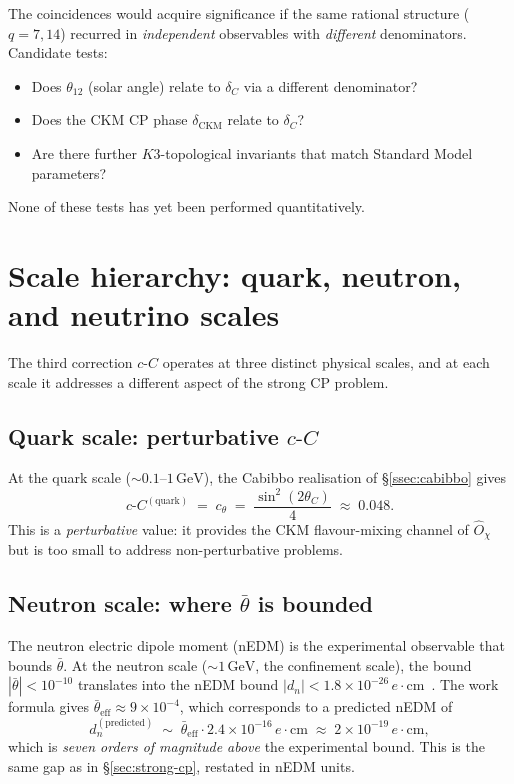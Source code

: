 \documentclass[11pt,a4paper]{article}
\newcommand{\dC}{\delta_C}
\newcommand{\cC}{c\text{-}C}
\newcommand{\Opchi}{\hat{O}_\chi}
\theoremstyle{plain}
\theoremstyle{definition}
\theoremstyle{remark}
\begin{document}
The coincidences would acquire significance if the same rational
structure ($q = 7, 14$) recurred in \emph{independent} observables
with \emph{different} denominators.  Candidate tests:
\begin{itemize}[leftmargin=1.4em,itemsep=1pt]
  \item Does $\theta_{12}$ (solar angle) relate to $\dC$ via a
        different denominator?
  \item Does the CKM CP phase $\delta_{\mathrm{CKM}}$ relate to
        $\dC$?
  \item Are there further $K3$-topological invariants that match
        Standard Model parameters?
\end{itemize}
None of these tests has yet been performed quantitatively.

\section{Scale hierarchy: quark, neutron, and neutrino scales}
\label{sec:scale}

The third correction $\cC$ operates at three distinct physical scales,
and at each scale it addresses a different aspect of the strong CP
problem.

\subsection{Quark scale: perturbative $\cC$}

At the quark scale ($\sim 0.1\text{--}1\,\mathrm{GeV}$), the Cabibbo
realisation of \S\ref{ssec:cabibbo} gives
\begin{equation}
  \cC^{\mathrm{(quark)}} \;=\; c_\theta
  \;=\; \frac{\sin^2(2\theta_C)}{4} \;\approx\; 0.048.
\end{equation}
This is a \emph{perturbative} value: it provides the CKM
flavour-mixing channel of $\Opchi$ but is too small to address
non-perturbative problems.

\subsection{Neutron scale: where $\bar\theta$ is bounded}

The neutron electric dipole moment (nEDM) is the experimental
observable that bounds $\bar\theta$.  At the neutron scale ($\sim
1\,\mathrm{GeV}$, the confinement scale), the bound
$|\bar\theta| < 10^{-10}$ translates into the nEDM bound
$|d_n| < 1.8 \times 10^{-26}\,e\cdot\mathrm{cm}$~\cite{abel2020nEDM}.
The work formula gives $\bar\theta_{\mathrm{eff}} \approx 9 \times
10^{-4}$, which corresponds to a predicted nEDM of
\begin{equation}
  d_n^{\mathrm{(predicted)}} \;\sim\; \bar\theta_{\mathrm{eff}}
  \cdot 2.4 \times 10^{-16}\,e\cdot\mathrm{cm}
  \;\approx\; 2 \times 10^{-19}\,e\cdot\mathrm{cm},
\end{equation}
which is \emph{seven orders of magnitude above} the experimental
bound.  This is the same gap as in \S\ref{sec:strong-cp}, restated
in nEDM units.
\end{document}

